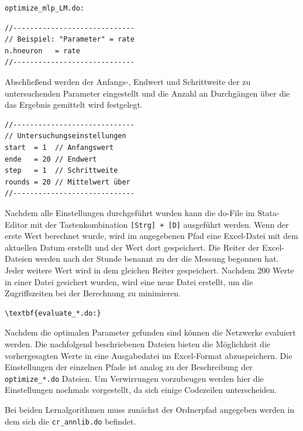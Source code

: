 \begin{Verbatim}
optimize_mlp_LM.do:
\end{Verbatim}
{
\begin{lstlisting}[firstnumber=299]
//-----------------------------
// Beispiel: "Parameter" = rate
n.hneuron	= rate
//-----------------------------
\end{lstlisting}
}

Abschließend werden der Anfangs-, Endwert und Schrittweite der zu untersuchenden Parameter eingestellt und die Anzahl an Durchgängen über die das Ergebnis gemittelt wird festgelegt.

{
\begin{lstlisting}[firstnumber=269]
//-----------------------------
// Untersuchungseinstellungen
start  = 1  // Anfangswert
ende   = 20 // Endwert
step   = 1  // Schrittweite
rounds = 20 // Mittelwert über
//-----------------------------
\end{lstlisting}
}

Nachdem alle Einstellungen durchgeführt wurden kann die do-File im Stata-Editor mit der Tastenkombination \verb|[Strg] + [D]| ausgeführt werden. Wenn der erste Wert berechnet wurde, wird im angegebenen Pfad eine Excel-Datei mit dem aktuellen Datum erstellt und der Wert dort gespeichert. Die Reiter der Excel-Dateien werden nach der Stunde benannt zu der die Messung begonnen hat. Jeder weitere Wert wird in dem gleichen Reiter gespeichert. Nachdem 200 Werte in einer Datei gesichert wurden, wird eine neue Datei erstellt, um die Zugriffszeiten bei der Berechnung zu minimieren.\\


\begin{Verbatim}[commandchars=\\\{\}]
\textbf{evaluate_*.do:}
\end{Verbatim}
Nachdem die optimalen Parameter gefunden sind können die Netzwerke evaluiert werden. Die nachfolgend beschriebenen Dateien bieten die Möglichkeit die vorhergesagten Werte in eine Ausgabedatei im Excel-Format abzuspeichern.
Die Einstellungen der einzelnen Pfade ist analog zu der Beschreibung der \verb|optimize_*.do| Dateien. Um Verwirrungen vorzubeugen werden hier die Einstellungen nochmals vorgestellt, da sich einige Codezeilen unterscheiden.

Bei beiden Lernalgorithmen muss zunächst der Ordnerpfad angegeben werden in dem sich die \verb|cr_annlib.do| befindet.

